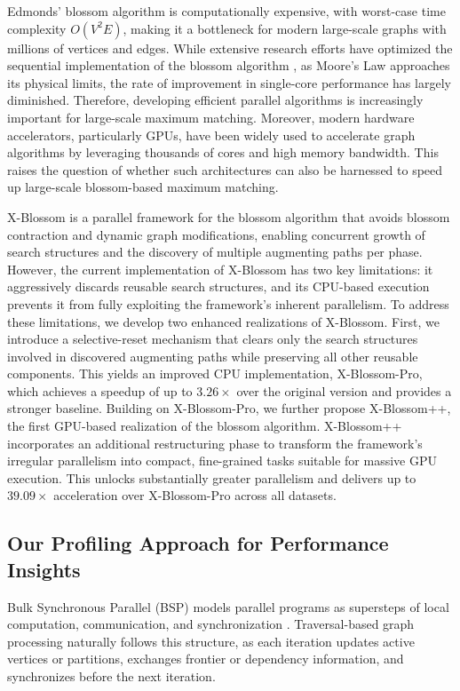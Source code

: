 Edmonds’ blossom algorithm is computationally expensive, with worst-case time complexity $O(V^2E)$, making it a bottleneck for modern large-scale graphs with millions of vertices and edges.
While extensive research efforts have optimized the sequential implementation of the blossom algorithm \cite{blum2015maximum, gabow1976efficient, gabow1984efficient, gabow1990data, gabow1991faster}, as Moore’s Law approaches its physical limits, the rate of improvement in single-core performance has largely diminished.
Therefore, developing efficient parallel algorithms is increasingly important for large-scale maximum matching.
Moreover, modern hardware accelerators, particularly GPUs, have been widely used to accelerate graph algorithms by leveraging thousands of cores and high memory bandwidth. 
This raises the question of whether such architectures can also be harnessed to speed up large-scale blossom-based maximum matching.


X-Blossom \cite{fan2025x} is a parallel framework for the blossom algorithm that avoids blossom contraction and dynamic graph modifications, enabling concurrent growth of search structures and the discovery of multiple augmenting paths per phase. 
However, the current implementation of X-Blossom has two key limitations: it aggressively discards reusable search structures, and its CPU-based execution prevents it from fully exploiting the framework's inherent parallelism.
To address these limitations, we develop two enhanced realizations of X-Blossom.
First, we introduce a selective-reset mechanism that clears only the search structures involved in discovered augmenting paths while preserving all other reusable components.
This yields an improved CPU implementation, X-Blossom-Pro, which achieves a speedup of up to $3.26\times$ over the original version and provides a stronger baseline.
Building on X-Blossom-Pro, we further propose X-Blossom++, the first GPU-based realization of the blossom algorithm.
X-Blossom++ incorporates an additional restructuring phase to transform the framework’s irregular parallelism into compact, fine-grained tasks suitable for massive GPU execution. 
This unlocks substantially greater parallelism and delivers up to $39.09\times$ acceleration over X-Blossom-Pro across all datasets.

\subsection{Our Profiling Approach for Performance Insights}
Bulk Synchronous Parallel (BSP) models parallel programs as supersteps of local computation, communication, and synchronization \cite{valiant1990bridging}.
Traversal-based graph processing naturally follows this structure, as each iteration updates active vertices or partitions, exchanges frontier or dependency information, and synchronizes before the next iteration.

